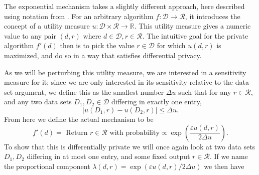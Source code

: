 \documentclass[a4paper,12pt]{article}
\newcommand{\fancy}{\mathcal}
\renewcommand{\epsilon}{\varepsilon}
\begin{document}
The exponential mechanism \cite{sherry_exponentialmech} takes a slightly different approach, here described using notation from \cite{dwork_privacybook}. For an arbitrary algorithm $f : \fancy{D} \to \fancy{R}$, it introduces the concept of a utility measure $u : \fancy{D} \times \fancy{R} \to \mathbb{R}$. This utility measure gives a numeric value to any pair $(d,r)$ where $d \in \fancy{D}, r \in \fancy{R}$. The intuitive goal for the private algorithm $f'(d)$ then is to pick the value $r \in \fancy{D}$ for which $u(d,r)$ is maximized, and do so in a way that satisfies differential privacy.

As we will be perturbing this utility measure, we are interested in a sensitivity measure for it; since we are only interested in its sensitivity relative to the data set argument, we define this as the smallest number $\Delta u$ such that for any $r \in \fancy{R}$, and any two data sets $D_1,D_2 \in \fancy{D}$ differing in exactly one entry,
\begin{equation}\label{eq:utility_sensitivity}
    |u(D_1,r) - u(D_2,r)| \leq \Delta u.
\end{equation}
From here we define the actual mechanism to be
\begin{equation*}
    f'(d) = \text{ Return } r \in \fancy{R} \text{ with probability} \propto \exp\left( \frac{\epsilon u(d,r)}{2\Delta u} \right).
\end{equation*}
To show that this is differentially private we will once again look at two data sets $D_1,D_2$ differing in at most one entry, and some fixed output $r \in \fancy{R}$. If we name the proportional component $\lambda(d,r) = \exp \left( \epsilon u(d,r) / 2 \Delta u \right)$ we then have
\end{document}

